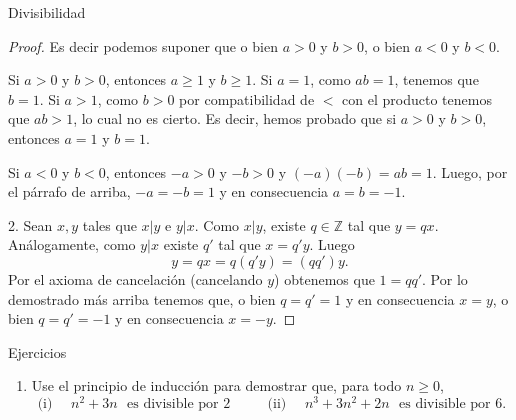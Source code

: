\documentclass[11pt,spanish,makeidx]{amsbook}
\theoremstyle{definition}
\theoremstyle{remark}
\begin{document}
\begin{section}{Divisibilidad}
\begin{proof}
Es decir podemos suponer que o bien $a>0$ y $b>0$, o bien $a<0$ y $b<0$. 

Si  $a>0$ y $b>0$, entonces  $a\ge 1$ y $b\ge 1$. Si $a=1$, como $ab =1$, tenemos que $b = 1$. Si $a>1$, como  $b>0$ por compatibilidad de $<$ con el producto tenemos que $ab>1$, lo cual no es cierto. Es decir, hemos probado que si  $a>0$ y $b>0$, entonces $a=1$ y $b=1$.

Si  $a<0$ y $b<0$, entonces   $-a>0$ y $-b>0$ y $(-a)(-b) = ab =1$. Luego, por el párrafo de arriba, $-a=-b=1$ y en consecuencia $a=b=-1$.

\vskip 0.1cm

2. Sean $x,y$ tales que  $x|y$ e $y|x$. Como $x|y$, existe $q \in \mathbb Z$ tal que $y = qx$. Análogamente, como $y|x$ existe $q'$ tal que $x = q'y$. Luego
$$
y = qx = q(q'y) = (qq')y.
$$
Por el axioma de cancelación (cancelando $y$) obtenemos que $1 = qq'$. Por lo demostrado más arriba tenemos que, o bien $q=q'=1$ y en consecuencia $x=y$, o bien $q=q'=-1$ y en consecuencia $x=-y$. 
\end{proof}

\begin{subsection}{Ejercicios}
\begin{enumerate}
\item Use el principio de inducción para demostrar que, para todo $n\ge0$,
$$
\text{ (i) } \quad n^2+3n \,\,\text{ es divisible por 2 } \qquad
\text{ (ii) } \quad n^3+3n^2+2n \,\,\text{ es divisible por 6. }
$$
\end{enumerate}
\end{subsection}
\end{section}
\end{document}
